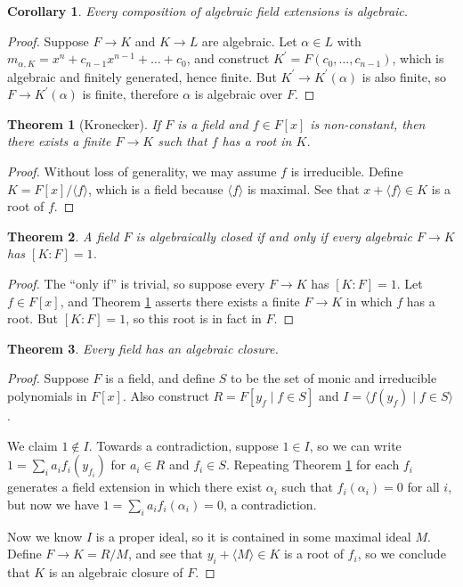 \documentclass[
    parskip=half,
    toc=flat,
    toc=sectionentrydotfill,
]{scrartcl}  %
\theoremstyle{definition}
\theoremstyle{plain}
\newtheorem{theorem}{Theorem}[section]
\newtheorem{corollary}{Corollary}[theorem]
\theoremstyle{remark}
\begin{document}
\begin{corollary}
    Every composition of algebraic field extensions is algebraic.
\end{corollary}

\begin{proof}
    Suppose $F\to K$ and $K\to L$ are algebraic.
    Let $\alpha\in L$ with $m_{\alpha,K}=x^n+c_{n-1}x^{n-1}+\dots+c_0$, and construct $K^\prime=F(c_0,\dots,c_{n-1})$,
    which is algebraic and finitely generated, hence finite.
    But $K^\prime\to K^\prime(\alpha)$ is also finite, so $F\to K^\prime(\alpha)$ is finite, therefore $\alpha$ is
    algebraic over $F$.
\end{proof}

\begin{theorem}[Kronecker]
    \label{thm:kronecker}
    If $F$ is a field and $f\in F[x]$ is non-constant, then there exists a finite $F\to K$ such that $f$ has a root in
    $K$.
\end{theorem}

\begin{proof}
    Without loss of generality, we may assume $f$ is irreducible.
    Define $K=F[x]/\langle f\rangle$, which is a field because $\langle f\rangle$ is maximal.
    See that $x+\langle f\rangle\in K$ is a root of $f$.
\end{proof}

\begin{theorem}
    A field $F$ is algebraically closed if and only if every algebraic $F\to K$ has $[K:F]=1$.
\end{theorem}

\begin{proof}
    The ``only if'' is trivial, so suppose every $F\to K$ has $[K:F]=1$.
    Let $f\in F[x]$, and Theorem \ref{thm:kronecker} asserts there exists a finite $F\to K$ in which $f$ has a root.
    But $[K:F]=1$, so this root is in fact in $F$.
\end{proof}

\begin{theorem}
    Every field has an algebraic closure.
\end{theorem}

\begin{proof}
    Suppose $F$ is a field, and define $S$ to be the set of monic and irreducible polynomials in $F[x]$.
    Also construct $R=F[y_f\mid f\in S]$ and $I=\langle f(y_f)\mid f\in S\rangle$.

    We claim $1\notin I$.
    Towards a contradiction, suppose $1\in I$, so we can write $1=\sum_ia_if_i(y_{f_i})$ for $a_i\in R$ and $f_i\in S$.
    Repeating Theorem \ref{thm:kronecker} for each $f_i$ generates a field extension in which there exist $\alpha_i$
    such that $f_i(\alpha_i)=0$ for all $i$, but now we have $1=\sum_ia_if_i(\alpha_i)=0$, a contradiction.

    Now we know $I$ is a proper ideal, so it is contained in some maximal ideal $M$.
    Define $F\to K=R/M$, and see that $y_i+\langle M\rangle\in K$ is a root of $f_i$, so we conclude that $K$ is an
    algebraic closure of $F$.
\end{proof}
\end{document}
